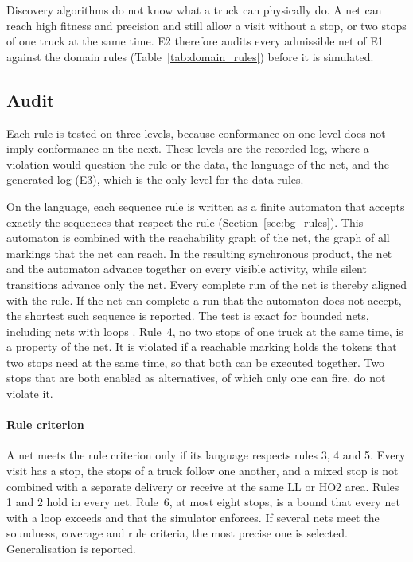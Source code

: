 Discovery algorithms do not know what a truck can physically do. A net can reach
high fitness and precision and still allow a visit without a stop, or two stops
of one truck at the same time. E2 therefore audits every admissible net of E1
against the domain rules (Table~\ref{tab:domain_rules}) before it is simulated.

\subsection{Audit}
Each rule is tested on three levels, because conformance on one level does not
imply conformance on the next. These levels are the recorded log, where a violation
would question the rule or the data, the language of the net, and the generated log
(E3), which is the only level for the data rules.

On the language, each sequence rule is written as a finite automaton that accepts
exactly the sequences that respect the rule (Section~\ref{sec:bg_rules}). This
automaton is combined with the reachability graph of the net, the graph of all
markings that the net can reach. In the resulting synchronous product, the net and
the automaton advance together on every visible activity, while silent transitions
advance only the net. Every complete run of the net is thereby aligned with the
rule. If the net can complete a run that the automaton does not accept, the
shortest such sequence is reported. The test is exact for bounded nets, including
nets with loops \cite{RWMaggi2011Monitoring,RWCarmona2022Conformance}. Rule~4, no
two stops of one truck at the same time, is a property of the net. It is violated if
a reachable marking holds the tokens that two stops need at the same time, so that
both can be executed together. Two stops that are both enabled as alternatives, of
which only one can fire, do not violate it.

\paragraph{Rule criterion} A net meets the rule criterion only if its language
respects rules 3, 4 and 5. Every visit has a stop, the stops of a truck follow one
another, and a mixed stop is not combined with a separate delivery or receive at
the same LL or HO2 area. Rules 1 and 2 hold in every net. Rule~6, at most eight
stops, is a bound that every net with a loop exceeds and that the simulator
enforces. If several nets meet the soundness, coverage and rule criteria, the most
precise one is selected. Generalisation is reported.

